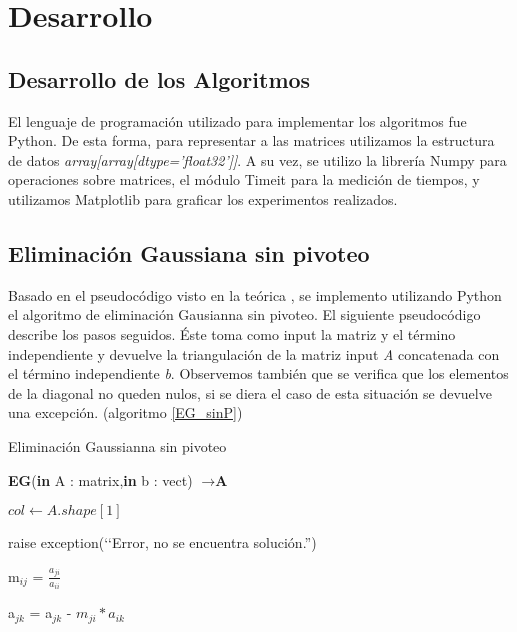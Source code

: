 \section{Desarrollo}
\subsection{Desarrollo de los Algoritmos}

El lenguaje de programación utilizado para implementar los algoritmos fue Python. De esta forma, para representar a las matrices utilizamos la estructura de datos \textit{array[array[dtype='float32']]}. 
A su vez, se utilizo la librería Numpy para operaciones sobre matrices, el módulo Timeit para la medición de tiempos, y utilizamos Matplotlib para graficar los experimentos realizados.

\subsection{Eliminación Gaussiana sin pivoteo}

Basado en el pseudocódigo visto en la teórica \cite{teoEG}, se implemento utilizando Python el algoritmo de eliminación Gausianna sin pivoteo. 
El siguiente pseudocódigo describe los pasos seguidos. Éste toma como input la matriz y el término independiente y devuelve la triangulación de la matriz input \textit{A} concatenada con el término independiente \textit{b}. Observemos también que se verifica que los elementos de la diagonal no queden nulos, si se diera el caso de esta situación se devuelve una excepción. (algoritmo \ref{EG_sinP})


\begin{algorithm}
\caption{Eliminación Gaussianna sin pivoteo}\label{EG_sinP}
\begin{algorithmic}
\State \textbf{EG}(\textbf{in} A : matrix,\textbf{in} b : vect) $\to \textbf{A}$
 
 \State $col \gets A.shape[1]$
 
        \State  raise exception(‘‘Error, no se encuentra solución.'') 
    \EndIf


    \State m$_{ij}$ = $\frac{a_{ji}}{a_{ii}}$
    
        \State a$_{jk}$ = a$_{jk}$ - $m_{ji}*{a_{ik}}$
    \EndFor

\EndFor
\EndFor
\end{algorithmic}
\end{algorithm}

